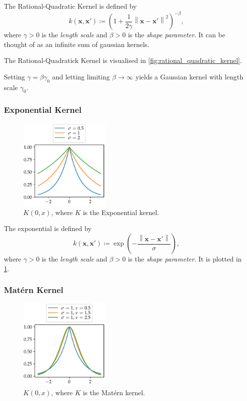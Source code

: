 \documentclass[11pt,twoside,openright]{report}
\newcommand\bx{\mathbf{x}}
\newcommand\norm[1]{\left\|#1\right\|}
\begin{document}
The Rational-Quadratic Kernel is defined by \[
    k(\bx, \bx') \coloneqq \left(1 + \frac{1}{2\gamma}\norm{\bx - \bx'}^2\right)^{-\beta} \text{,}
\] where $\gamma > 0$ is the \textit{length scale} and $\beta > 0$ is the \textit{shape parameter}. It can be thought of as an infinite sum of gaussian kernels.

The Rational-Quadratick Kernel is visualised in \cref{fig:rational_quadratic_kernel}.

Setting $\gamma = \beta \gamma_0$ and letting limiting $\beta \to \infty$ yields a Gaussian kernel with length scale $\gamma_0$.

\subsubsection{Exponential Kernel}
  \begin{figure}
    \centering
    \includegraphics[width=0.4\textwidth]{exponential_kernel_plot.pdf}
    \caption{$K(0, x)$, where $K$ is the Exponential kernel.}
    \label{fig:exponential_kernel}
  \end{figure}

  The exponential is defined by \[
    k(\bx, \bx') \coloneqq \exp\left( - \frac{\norm{\bx - \bx'}}{\sigma} \right) \text{,}
  \] where $\gamma > 0$ is the \textit{length scale} and $\beta > 0$ is the \textit{shape parameter}. It is plotted in \cref{fig:exponential_kernel}.


\subsubsection{Mat\'ern Kernel}

  \begin{figure}
    \centering
    \includegraphics[width=0.4\textwidth]{matern_kernel_plot.pdf}
    \caption{$K(0, x)$, where $K$ is the Mat\'ern kernel.}
    \label{fig:matern_kernel}
  \end{figure}
\end{document}
